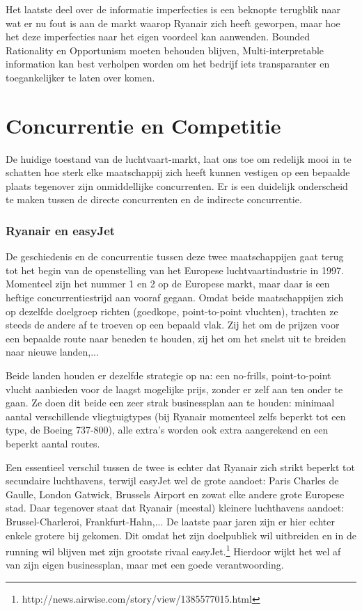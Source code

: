 \documentclass{article}
\begin{document}
Het laatste deel over de informatie imperfecties is een beknopte terugblik naar wat er nu fout is aan de markt waarop Ryanair zich heeft geworpen, maar hoe het deze imperfecties naar het eigen voordeel kan aanwenden. Bounded Rationality en Opportunism moeten behouden blijven, Multi-interpretable information kan best verholpen worden om het bedrijf iets transparanter en toegankelijker te laten over komen.

\newpage
\part{Concurrentie en Competitie}

De huidige toestand van de luchtvaart-markt, laat ons toe om redelijk mooi in te schatten hoe sterk elke maatschappij zich heeft kunnen vestigen op een bepaalde plaats tegenover zijn onmiddellijke concurrenten.
Er is een duidelijk onderscheid te maken tussen de directe concurrenten en de indirecte concurrentie.

\section{Ryanair en easyJet}

De geschiedenis en de concurrentie tussen deze twee maatschappijen gaat terug tot het begin van de openstelling van het Europese luchtvaartindustrie in 1997. Momenteel zijn het nummer 1 en 2 op de Europese markt, maar daar is een heftige concurrentiestrijd aan vooraf gegaan. Omdat beide maatschappijen zich op dezelfde doelgroep richten (goedkope, point-to-point vluchten), trachten ze steeds de andere af te troeven op een bepaald vlak. Zij het om de prijzen voor een bepaalde route naar beneden te houden, zij het om het snelst uit te breiden naar nieuwe landen,...

Beide landen houden er dezelfde strategie op na: een no-frills, point-to-point vlucht aanbieden voor de laagst mogelijke prijs, zonder er zelf aan ten onder te gaan. Ze doen dit beide een zeer strak businessplan aan te houden: minimaal aantal verschillende vliegtuigtypes (bij Ryanair momenteel zelfs beperkt tot een type, de Boeing 737-800), alle extra's worden ook extra aangerekend en een beperkt aantal routes.

Een essentieel verschil tussen de twee is echter dat Ryanair zich strikt beperkt tot secundaire luchthavens, terwijl easyJet wel de grote aandoet: Paris Charles de Gaulle, London Gatwick, Brussels Airport en zowat elke andere grote Europese stad. Daar tegenover staat dat Ryanair (meestal) kleinere luchthavens aandoet: Brussel-Charleroi, Frankfurt-Hahn,... De laatste paar jaren zijn er hier echter enkele grotere bij gekomen. Dit omdat het zijn doelpubliek wil uitbreiden en in de running wil blijven met zijn grootste rivaal easyJet.\footnote{http://news.airwise.com/story/view/1385577015.html} Hierdoor wijkt het wel af van zijn eigen businessplan, maar met een goede verantwoording.
\end{document}
